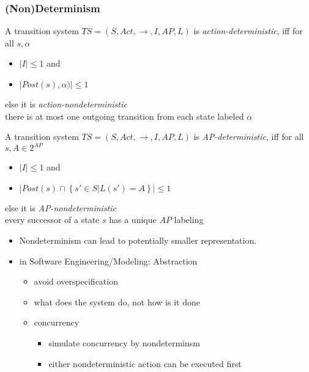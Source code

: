 \documentclass[a4paper, 10pt]{article}
\begin{document}
\subsubsection{(Non)Determinism}
\begin{shaded}
    A transition system $TS=\left(S,Act,\to,I,AP,L\right)$ is \emph{action-deterministic}, iff for all $s,\alpha$
    \begin{itemize}
        \item $|I|\leq1$ and
        \item $|Post(s),\alpha)|\leq1$
    \end{itemize}
    else it is \emph{action-nondeterministic} \\
    {\tiny there is at most one outgoing transition from each state labeled $\alpha$}
\end{shaded}

\begin{shaded}
    A transition system $TS=\left(S,Act,\to,I,AP,L\right)$ is \emph{AP-deterministic}, iff for all $s,A\in2^{AP}$
    \begin{itemize}
        \item $|I|\leq1$ and
        \item $|Post(s)\cap \left\{s'\in S | L(s')=A\right\}|\leq1$
    \end{itemize}
    else it is \emph{AP-nondeterministic} \\
    {\tiny every successor of a state $s$ has a unique $AP$ labeling}
\end{shaded}

\begin{itemize}
    \item Nondeterminism can lead to potentially smaller representation.
    \item in Software Engineering/Modeling: Abstraction
    \begin{itemize}
        \item avoid overspecification
        \item what does the system do, not how is it done
    \end{itemize}
    \begin{itemize}
        \item concurrency
        \begin{itemize}
            \item simulate concurrency by nondeterminsm
            \item either nondeterministic action can be executed first
        \end{itemize}
    \end{itemize}
\end{itemize}
\end{document}

